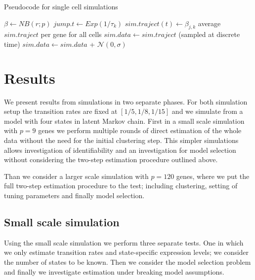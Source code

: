 \begin{algorithm}
    \caption{Pseudocode for single cell simulations}\label{alg:simulation-framework}
    \begin{algorithmic}[0]
        \State $\beta \gets   NB(r;p)$
        \State $jump.t \gets Exp(1/\tau_k)$
        \State $sim.traject(t) \gets \beta_{j,k}$
        \EndWhile
        \EndFor
        \EndFor
        \State average $sim.traject$ per gene for all cells
        \State $sim.data \gets sim.traject$ (sampled at discrete time)
        \State $sim.data \gets sim.data$ + $\mathcal{N}(0, \sigma)$
        \EndProcedure
      \end{algorithmic}
\end{algorithm}

\section{Results}
\label{sec:results}

We present results from simulations in two separate phases. For both simulation setup the transition rates are fixed at $[1/5, 1/8, 1/15]$ and we simulate from a model with four states in latent Markov chain. First in a small scale simulation with $p=9$ genes we perform multiple rounds of direct estimation of the whole data without the need for the initial clustering step. This simpler simulations allows investigation of identifiability and an investigation for model selection without considering the two-step estimation procedure outlined above.

Than we consider a larger scale simulation with $p=120$ genes, where we put the full two-step estimation procedure to the test; including clustering, setting of tuning parameters and finally model selection.



\subsection{Small scale simulation}
\label{sec:small-scale-model}

Using the small scale simulation we perform three separate  tests. One in which we only estimate transition rates and state-specific expression levels; we consider the number of states to be known. Then we consider the model selection problem and finally we investigate estimation under breaking model assumptions.


